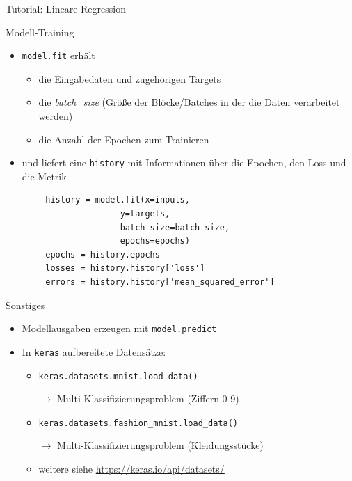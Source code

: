 \documentclass[utf8, smaller, c]{beamer}
\renewcommand{\tt}[1]{{\texttt{#1}}}
\begin{document}
\begin{frame}{Tutorial: Lineare Regression}
	\framebreak
	
	\begin{block}{Modell-Training}
	    \begin{itemize}
	        \item \tt{model.fit} erhält
	        \begin{itemize}
	            \item die Eingabedaten und zugehörigen Targets
	            \item die \textit{batch\_size} (Größe der Blöcke/Batches in der die Daten verarbeitet werden)
	            \item die Anzahl der Epochen zum Trainieren
	        \end{itemize}
	        \item und liefert eine \tt{history} mit Informationen über die Epochen, den Loss und die Metrik
	    \end{itemize}
	    \begin{lstlisting}
        history = model.fit(x=inputs,
                       y=targets,
                       batch_size=batch_size,
                       epochs=epochs)
        epochs = history.epochs
        losses = history.history['loss']
        errors = history.history['mean_squared_error']
	    \end{lstlisting}
	\end{block}
\end{frame}

\begin{frame}[fragile]{Sonstiges}
    \begin{itemize}
        \item Modellausgaben erzeugen mit \tt{model.predict}
        \item In \tt{keras} aufbereitete Datensätze:
        \begin{itemize}
            \item \tt{keras.datasets.mnist.load\_data()}
            \item[$\rightarrow$] Multi-Klassifizierungsproblem (Ziffern 0-9)
            \item \tt{keras.datasets.fashion\_mnist.load\_data()}
            \item[$\rightarrow$] Multi-Klassifizierungsproblem (Kleidungsstücke)
            \item weitere siehe {\footnotesize\url{https://keras.io/api/datasets/}}
        \end{itemize}
    \end{itemize}
    
\end{frame}
\end{document}

